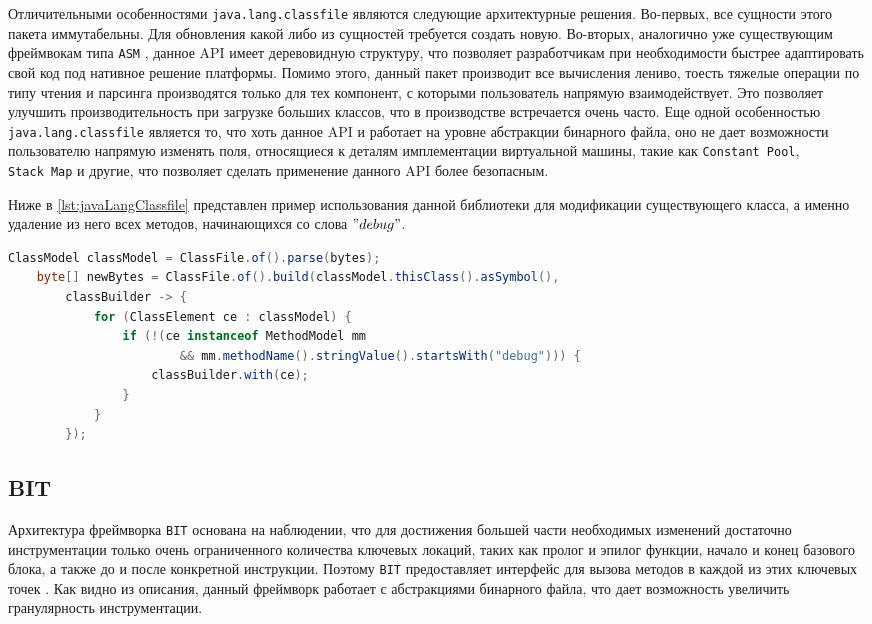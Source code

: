 Отличительными особенностями \texttt{java.lang.classfile} являются следующие архитектурные решения. Во-первых, все сущности этого пакета иммутабельны. Для обновления какой либо из сущностей требуется создать новую. Во-вторых, аналогично уже существующим фреймвокам типа \texttt{ASM} \cite{asm}, данное API имеет деревовидную структуру, что позволяет разработчикам при необходимости быстрее адаптировать свой код под нативное решение платформы. Помимо этого, данный пакет производит все вычисления лениво, тоесть тяжелые операции по типу чтения и парсинга производятся только для тех компонент, с которыми пользователь напрямую взаимодействует. Это позволяет улучшить производительность при загрузке больших классов, что в производстве встречается очень часто. Еще одной особенностью \texttt{java.lang.classfile} является то, что хоть данное API и работает на уровне абстракции бинарного файла, оно не дает возможности пользователю напрямую изменять поля, относящиеся к деталям имплементации виртуальной машины, такие как \texttt{Constant~Pool}, \texttt{Stack~Map} и другие, что позволяет сделать применение данного API более безопасным.

Ниже в \autoref{lst:javaLangClassfile} представлен пример использования данной библиотеки для модификации существующего класса, а именно удаление из него всех методов, начинающихся со слова $"debug"$.

\begin{lstlisting}[language=Java, caption=Удаление методов отладки из класса при помощи библиотеки \texttt{java.lang.classfile}, label=lst:javaLangClassfile]
    ClassModel classModel = ClassFile.of().parse(bytes);
    byte[] newBytes = ClassFile.of().build(classModel.thisClass().asSymbol(),
        classBuilder -> {
            for (ClassElement ce : classModel) {
                if (!(ce instanceof MethodModel mm
                        && mm.methodName().stringValue().startsWith("debug"))) {
                    classBuilder.with(ce);
                }
            }
        });
\end{lstlisting}

\subsection{BIT}

Архитектура фреймворка \texttt{BIT} основана на наблюдении, что для достижения большей части необходимых изменений достаточно инструментации только очень ограниченного количества ключевых локаций, таких как пролог и эпилог функции, начало и конец базового блока, а также до и после конкретной инструкции. Поэтому \texttt{BIT} предоставляет интерфейс для вызова методов в каждой из этих ключевых точек \cite{bit}. Как видно из описания, данный фреймворк работает с абстракциями бинарного файла, что дает возможность увеличить гранулярность инструментации.

